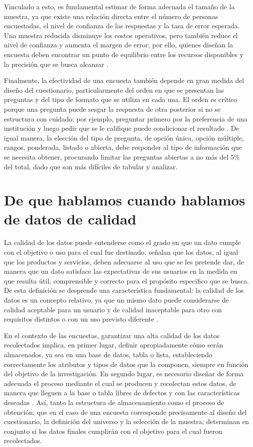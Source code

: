 \documentclass[12pt, letterpaper]{article}
\begin{document}
Vinculado a esto, es fundamental estimar de forma adecuada el tamaño de la muestra,
ya que existe una relación directa entre el número de personas encuestadas, el nivel de
confianza de las respuestas y la tasa de error esperada. Una muestra reducida disminuye
los costos operativos, pero también reduce el nivel de confianza y aumenta el margen de error;
por ello, quienes diseñan la encuesta deben encontrar un punto de equilibrio entre
los recursos disponibles y la precisión que se busca alcanzar \parencite{linares2025guia}.

Finalmente, la efectividad de una encuesta también depende en gran medida del diseño del cuestionario, particularmente del orden en que se presentan las preguntas y del tipo de formato que se utiliza en cada una. El orden es crítico porque una pregunta puede sesgar la respuesta de otra posterior si no se estructura con cuidado; por ejemplo, preguntar primero por la preferencia de una institución y luego pedir que se le califique puede condicionar el resultado \parencite{linares2025guia}. De igual manera, la elección del tipo de pregunta, de opción única, opción múltiple, rangos, ponderada, listado o abierta, debe responder al tipo de información que se necesita obtener, procurando limitar las preguntas abiertas a no más del 5\% del total, dado que son más difíciles de tabular y analizar.

\section*{De que hablamos cuando hablamos de datos de calidad}
La calidad de los datos puede entenderse como el grado en que un dato cumple con el objetivo o uso para el cual fue destinado.\parencite{duarte2024encuesta} señalan que los datos, al igual que los productos y servicios, deben adecuarse al uso que se les pretende dar, de manera que un dato satisface las expectativas de sus usuarios en la medida en que resulta útil, comprensible y correcto para el propósito específico que se busca. De esta definición se desprende una característica fundamental: la calidad de los datos es un concepto relativo, ya que un mismo dato puede considerarse de calidad aceptable para un usuario y de calidad inaceptable para otro con requisitos distintos o con un uso previsto diferente \parencite{heredia2009calidad}.

En el contexto de las encuestas, garantizar una alta calidad de los datos recolectados implica, en primer lugar, definir apropiadamente cómo serán almacenados, ya sea en una base de datos, tabla o lista, estableciendo correctamente los atributos y tipos de datos que la componen, siempre en función del objetivo de la investigación. En segundo lugar, es necesario diseñar de forma adecuada el proceso mediante el cual se producen y recolectan estos datos, de manera que lleguen a la base o tabla libres de defectos y con las características deseadas \parencite{heredia2009calidad}. Así, tanto la estructura de almacenamiento como el proceso de obtención, que en el caso de una encuesta corresponde precisamente al diseño del cuestionario, la definición del universo y la selección de la muestra, determinan en conjunto si los datos finales cumplirán con el objetivo para el cual fueron recolectados.
\end{document}
